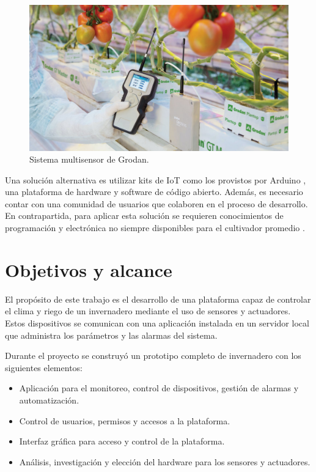\begin{figure}[hb]
\centering 
\includegraphics[width=.5\textwidth]{../Figures/grodan.jpg}
\caption[Sistema multisensor de Grodan]{Sistema multisensor de Grodan\protect\footnotemark.}
\label{fig:growlink}
\end{figure}



Una solución alternativa es utilizar kits de IoT como los provistos por Arduino \citep{arduino}, una plataforma de hardware y software de código abierto. Además, es necesario contar con una comunidad de usuarios que colaboren en el proceso de desarrollo. En contrapartida, para aplicar esta solución se requieren conocimientos de programación y electrónica no siempre disponibles para el cultivador promedio \citep{digger:1}. \\



\section{Objetivos y alcance}
\label{sec:objetivos}

El propósito de este trabajo es el desarrollo de una plataforma capaz de controlar el clima y riego de un invernadero mediante el uso de sensores y actuadores. Estos dispositivos se comunican con una aplicación instalada en un servidor local que administra los parámetros y las alarmas del sistema.

Durante el proyecto se construyó un prototipo completo de invernadero con los siguientes elementos:
 
\begin{itemize}
	\item Aplicación para el monitoreo, control de dispositivos, gestión de alarmas y automatización.
	\item Control de usuarios, permisos y accesos a la plataforma.
	\item Interfaz gráfica para acceso y control de la plataforma.
	\item Análisis, investigación y elección del hardware para los sensores y actuadores.


\end{itemize}


